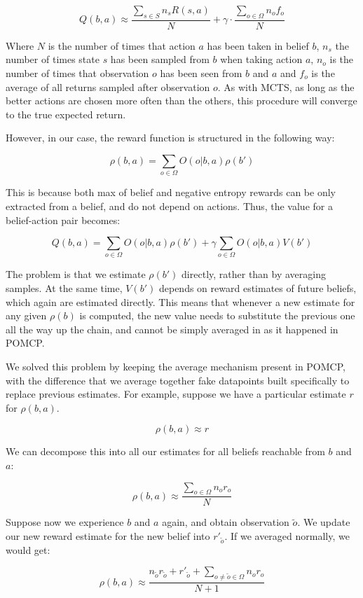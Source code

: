 \[ Q(b,a) \approx \frac{\sum_{s \in S} n_s R(s,a)}{N} + \gamma \cdot \frac{\sum_{o\in \Omega} n_o f_o}{N} \]

Where $N$ is the number of times that action $a$ has been taken in belief $b$, $n_s$ the number of
times state $s$ has been sampled from $b$ when taking action $a$, $n_o$ is the number of times that
observation $o$ has been seen from $b$ and $a$ and $f_o$ is the average of all returns sampled after
observation $o$. As with MCTS, as long as the better actions are chosen more often than the others,
this procedure will converge to the true expected return.

However, in our case, the reward function is structured in the following way:

\[ \rho(b,a) = \sum_{o\in \Omega} O(o | b, a) \rho(b') \]

This is because both max of belief and negative entropy rewards can be only extracted from a belief,
and do not depend on actions. Thus, the value for a belief-action pair becomes:

\[ Q(b,a) = \sum_{o\in \Omega} O(o | b,a) \rho(b') + \gamma\sum_{o\in\Omega} O(o|b,a) V(b') \]

The problem is that we estimate $\rho(b')$ directly, rather than by averaging samples. At the same
time, $V(b')$ depends on reward estimates of future beliefs, which again are estimated directly.
This means that whenever a new estimate for any given $\rho(b)$ is computed, the new value needs to
substitute the previous one all the way up the chain, and cannot be simply averaged in as it
happened in POMCP.

We solved this problem by keeping the average mechanism present in POMCP, with the difference that
we average together fake datapoints built specifically to replace previous estimates. For
example, suppose we have a particular estimate $r$ for $\rho(b, a)$.

\[ \rho(b,a) \approx r \]

We can decompose this into all our estimates for all beliefs reachable from $b$ and $a$:

\[ \rho(b,a) \approx \frac{\sum_{o\in\Omega} n_o r_o}{N} \]

Suppose now we experience $b$ and $a$ again, and obtain observation $\tilde{o}$. We update our new
reward estimate for the new belief into $r'_{\tilde{o}}$. If we averaged normally, we would get:

\[ \rho(b,a) \approx \frac{ n_{\tilde{o}} r_{\tilde{o}} + r'_{\tilde{o}} +
\sum_{o \neq \tilde{o} \in \Omega} n_o r_o}{N+1} \]

